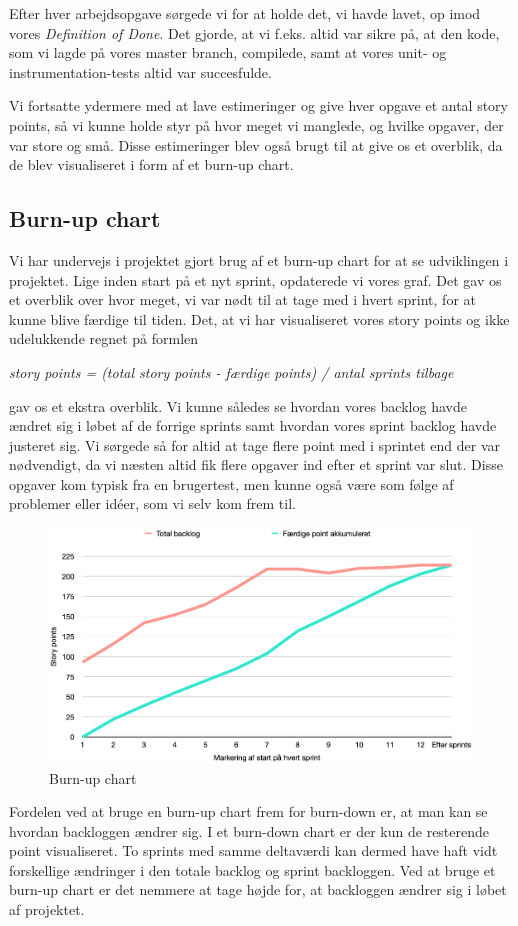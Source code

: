 Efter hver arbejdsopgave sørgede vi for at holde det, vi havde lavet, op imod vores \textit{Definition of Done}. Det gjorde, at vi f.eks. altid var sikre på, at den kode, som vi lagde på vores master branch, compilede, samt at vores unit- og instrumentation-tests altid var succesfulde.

Vi fortsatte ydermere med at lave estimeringer og give hver opgave et antal story points, så vi kunne holde styr på hvor meget vi manglede, og hvilke opgaver, der var store og små. Disse estimeringer blev også brugt til at give os et overblik, da de blev visualiseret i form af et burn-up chart.

\subsection{Burn-up chart}
Vi har undervejs i projektet gjort brug af et burn-up chart for at se udviklingen i projektet. Lige inden start på et nyt sprint, opdaterede vi vores graf. Det gav os et overblik over hvor meget, vi var nødt til at tage med i hvert sprint, for at kunne blive færdige til tiden. Det, at vi har visualiseret vores story points og ikke udelukkende regnet på formlen \medskip

\textit{story points = (total story points - færdige points) / antal sprints tilbage} \smallskip

gav os et ekstra overblik. Vi kunne således se hvordan vores backlog havde ændret sig i løbet af de forrige sprints samt hvordan vores sprint backlog havde justeret sig.  Vi sørgede så for altid at tage flere point med i sprintet end der var nødvendigt, da vi næsten altid fik flere opgaver ind efter et sprint var slut. Disse opgaver kom typisk fra en brugertest, men kunne også være som følge af problemer eller idéer, som vi selv kom frem til.

\begin{figure}[H]
    \centering
    \includegraphics[width=1\textwidth]{img/burn-up-chart.png}
    \caption{Burn-up chart}
    \label{burn-up}
\end{figure}

Fordelen ved at bruge en burn-up chart frem for burn-down er, at man kan se hvordan backloggen ændrer sig. I et burn-down chart er der kun de resterende point visualiseret. To sprints med samme deltaværdi kan dermed have haft vidt forskellige ændringer i den totale backlog og sprint backloggen. Ved at bruge et burn-up chart er det nemmere at tage højde for, at backloggen ændrer sig i løbet af projektet.
